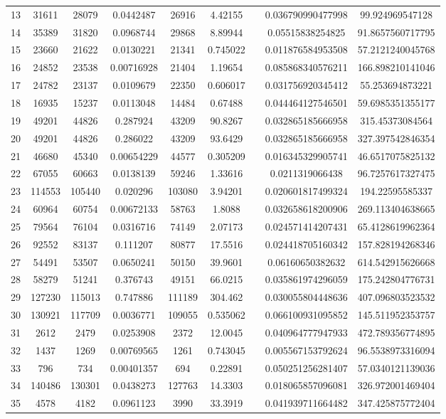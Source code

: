 \documentclass{article}
\begin{document}
\begin{table}[h!]
\begin{tabular}{c||c|c|c|c|c c c|c}
13 & 31611 & 28079 & 0.0442487 & 26916 & 4.42155 &  & 0.036790990477998 & 99.924969547128 \\
14 & 35389 & 31820 & 0.0968744 & 29868 & 8.89944 &  & 0.05515838254825 & 91.8657560717795 \\
15 & 23660 & 21622 & 0.0130221 & 21341 & 0.745022 &  & 0.011876584953508 & 57.2121240045768 \\
16 & 24852 & 23538 & 0.00716928 & 21404 & 1.19654 &  & 0.085868340576211 & 166.898210141046 \\
17 & 24782 & 23137 & 0.0109679 & 22350 & 0.606017 &  & 0.031756920345412 & 55.253694873221 \\
18 & 16935 & 15237 & 0.0113048 & 14484 & 0.67488 &  & 0.044464127546501 & 59.6985351355177 \\
19 & 49201 & 44826 & 0.287924 & 43209 & 90.8267 &  & 0.032865185666958 & 315.45373084564 \\
20 & 49201 & 44826 & 0.286022 & 43209 & 93.6429 &  & 0.032865185666958 & 327.397542846354 \\
21 & 46680 & 45340 & 0.00654229 & 44577 & 0.305209 &  & 0.016345329905741 & 46.6517075825132 \\
22 & 67055 & 60663 & 0.0138139 & 59246 & 1.33616 &  & 0.0211319066438 & 96.7257617327475 \\
23 & 114553 & 105440 & 0.020296 & 103080 & 3.94201 &  & 0.020601817499324 & 194.22595585337 \\
24 & 60964 & 60754 & 0.00672133 & 58763 & 1.8088 &  & 0.032658618200906 & 269.113404638665 \\
25 & 79564 & 76104 & 0.0316716 & 74149 & 2.07173 &  & 0.024571414207431 & 65.4128619962364 \\
26 & 92552 & 83137 & 0.111207 & 80877 & 17.5516 &  & 0.024418705160342 & 157.828194268346 \\
27 & 54491 & 53507 & 0.0650241 & 50150 & 39.9601 &  & 0.06160650382632 & 614.542915626668 \\
28 & 58279 & 51241 & 0.376743 & 49151 & 66.0215 &  & 0.035861974296059 & 175.242804776731 \\
29 & 127230 & 115013 & 0.747886 & 111189 & 304.462 &  & 0.030055804448636 & 407.096803523532 \\
30 & 130921 & 117709 & 0.0036771 & 109055 & 0.535062 &  & 0.066100931095852 & 145.511952353757 \\
31 & 2612 & 2479 & 0.0253908 & 2372 & 12.0045 &  & 0.040964777947933 & 472.789356774895 \\
32 & 1437 & 1269 & 0.00769565 & 1261 & 0.743045 &  & 0.005567153792624 & 96.5538973316094 \\
33 & 796 & 734 & 0.00401357 & 694 & 0.22891 &  & 0.050251256281407 & 57.0340121139036 \\
34 & 140486 & 130301 & 0.0438273 & 127763 & 14.3303 &  & 0.018065857096081 & 326.972001469404 \\
35 & 4578 & 4182 & 0.0961123 & 3990 & 33.3919 &  & 0.041939711664482 & 347.425875772404 \\
\end{tabular}
\end{table}
\end{document}
